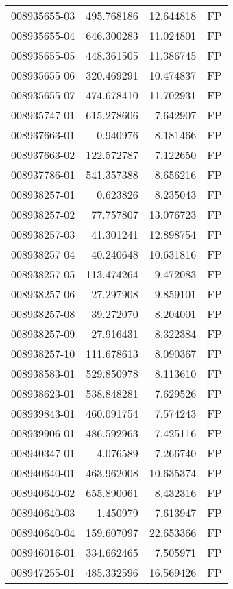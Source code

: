 \begin{tabular}{lrrl}
008935655-03 &  495.768186 &    12.644818 &   FP \\
008935655-04 &  646.300283 &    11.024801 &   FP \\
008935655-05 &  448.361505 &    11.386745 &   FP \\
008935655-06 &  320.469291 &    10.474837 &   FP \\
008935655-07 &  474.678410 &    11.702931 &   FP \\
008935747-01 &  615.278606 &     7.642907 &   FP \\
008937663-01 &    0.940976 &     8.181466 &   FP \\
008937663-02 &  122.572787 &     7.122650 &   FP \\
008937786-01 &  541.357388 &     8.656216 &   FP \\
008938257-01 &    0.623826 &     8.235043 &   FP \\
008938257-02 &   77.757807 &    13.076723 &   FP \\
008938257-03 &   41.301241 &    12.898754 &   FP \\
008938257-04 &   40.240648 &    10.631816 &   FP \\
008938257-05 &  113.474264 &     9.472083 &   FP \\
008938257-06 &   27.297908 &     9.859101 &   FP \\
008938257-08 &   39.272070 &     8.204001 &   FP \\
008938257-09 &   27.916431 &     8.322384 &   FP \\
008938257-10 &  111.678613 &     8.090367 &   FP \\
008938583-01 &  529.850978 &     8.113610 &   FP \\
008938623-01 &  538.848281 &     7.629526 &   FP \\
008939843-01 &  460.091754 &     7.574243 &   FP \\
008939906-01 &  486.592963 &     7.425116 &   FP \\
008940347-01 &    4.076589 &     7.266740 &   FP \\
008940640-01 &  463.962008 &    10.635374 &   FP \\
008940640-02 &  655.890061 &     8.432316 &   FP \\
008940640-03 &    1.450979 &     7.613947 &   FP \\
008940640-04 &  159.607097 &    22.653366 &   FP \\
008946016-01 &  334.662465 &     7.505971 &   FP \\
008947255-01 &  485.332596 &    16.569426 &   FP \\

\end{tabular}

